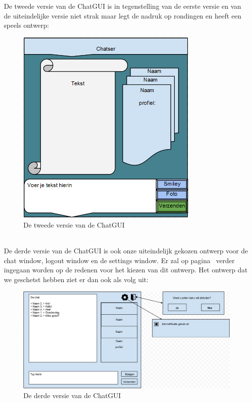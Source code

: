 \documentclass[12pt]{article}
\begin{document}
\noindent De tweede versie van de ChatGUI is in tegenstelling van de eerste versie en van de uiteindelijke versie niet strak maar legt de nadruk op rondingen en heeft een speels ontwerp:
\begin{figure}[ht]
\begin{center}
\includegraphics[width = 90mm]{ChGDv2}
\caption{De tweede versie van de ChatGUI}
\label{figure002}
\end{center}
\end{figure}
\\

\noindent De derde versie van de ChatGUI is ook onze uiteindelijk gekozen ontwerp voor de chat window, logout window en de settings window. Er zal op pagina~\pageref{ChatGUI} verder ingegaan worden op de redenen voor het kiezen van dit ontwerp. Het ontwerp dat we geschetst hebben ziet er dan ook als volg uit:
\label{ChGv3Chat}
\begin{figure}[ht]
\begin{center}
\includegraphics[width = 150mm]{ChGDv3}
\caption{De derde versie van de ChatGUI}
\label{figure003}
\end{center}
\end{figure}
\\
\end{document}
